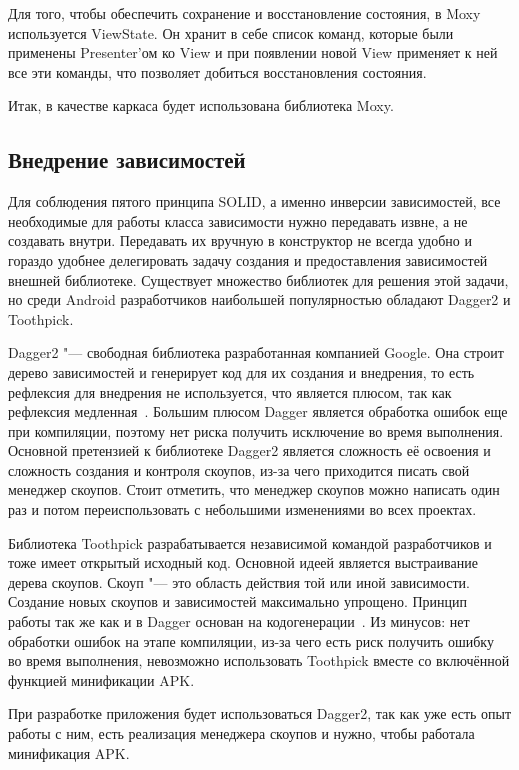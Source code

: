 
Для того, чтобы обеспечить сохранение и восстановление состояния, в Moxy используется ViewState.
Он хранит в себе список команд, которые были применены Presenter'ом ко View и при появлении новой View применяет к ней все эти команды, что позволяет добиться восстановления состояния.

Итак, в качестве каркаса будет использована библиотека Moxy.

\subsection{Внедрение зависимостей}
\label{subsec:di}
Для соблюдения пятого принципа SOLID, а именно инверсии зависимостей, все необходимые для работы класса зависимости нужно передавать извне, а не создавать внутри.
Передавать их вручную в конструктор не всегда удобно и гораздо удобнее делегировать задачу создания и предоставления зависимостей внешней библиотеке.
Существует множество библиотек для решения этой задачи, но среди Android разработчиков наибольшей популярностью обладают Dagger2 и Toothpick.

Dagger2 "--- свободная библиотека разработанная компанией Google.
Она строит дерево зависимостей и генерирует код для их создания и внедрения, то есть рефлексия для внедрения не используется, что является плюсом, так как рефлексия медленная~\cite{dagger}.
Большим плюсом Dagger является обработка ошибок еще при компиляции, поэтому нет риска получить исключение во время выполнения.
Основной претензией к библиотеке Dagger2 является сложность её освоения и сложность создания и контроля скоупов, из-за чего приходится писать свой менеджер скоупов.
Стоит отметить, что менеджер скоупов можно написать один раз и потом переиспользовать с небольшими изменениями во всех проектах.

Библиотека Toothpick разрабатывается независимой командой разработчиков и тоже имеет открытый исходный код.
Основной идеей является выстраивание дерева скоупов.
Скоуп "--- это область действия той или иной зависимости.
Создание новых скоупов и зависимостей максимально упрощено.
Принцип работы так же как и в Dagger основан на кодогенерации~\cite{github:tp}.
Из минусов: нет обработки ошибок на этапе компиляции, из-за чего есть риск получить ошибку во время выполнения, невозможно использовать Toothpick вместе со включённой функцией минификации APK\@.

При разработке приложения будет использоваться Dagger2, так как уже есть опыт работы с ним, есть реализация менеджера скоупов и нужно, чтобы работала минификация APK\@.

